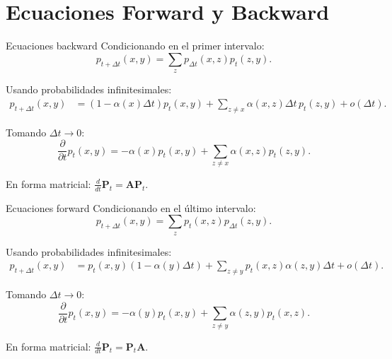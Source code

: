 \documentclass[aspectratio=169]{beamer}
\theoremstyle{plain}
\theoremstyle{definition}
\newcommand{\A}{\mathbf{A}}
\newcommand{\PP}{\mathbf{P}}
\newcommand{\1}{\mathbf{1}}
\begin{document}
\section{Ecuaciones Forward y Backward}

\begin{frame}{Ecuaciones backward}
  Condicionando en el primer intervalo:
  \[ p_{t+\Delta t}(x,y) = \sum_z p_{\Delta t}(x,z) p_t(z,y). \]
  
  Usando probabilidades infinitesimales:
  \begin{align*}
    p_{t+\Delta t}(x,y) &= (1-\alpha(x)\Delta t)p_t(x,y) + \sum_{z\neq x} \alpha(x,z)\Delta t\, p_t(z,y) + o(\Delta t).
  \end{align*}
  
  Tomando $\Delta t\to 0$:
  \[ \frac{\partial}{\partial t} p_t(x,y) = -\alpha(x)p_t(x,y) + \sum_{z\neq x} \alpha(x,z)p_t(z,y). \]
  
  En forma matricial: $\displaystyle\frac{d}{dt}\PP_t = \A\PP_t$.
\end{frame}

\begin{frame}{Ecuaciones forward}
  Condicionando en el último intervalo:
  \[ p_{t+\Delta t}(x,y) = \sum_z p_t(x,z) p_{\Delta t}(z,y). \]
  
  Usando probabilidades infinitesimales:
  \begin{align*}
    p_{t+\Delta t}(x,y) &= p_t(x,y)(1-\alpha(y)\Delta t) + \sum_{z\neq y} p_t(x,z)\alpha(z,y)\Delta t + o(\Delta t).
  \end{align*}
  
  Tomando $\Delta t\to 0$:
  \[ \frac{\partial}{\partial t} p_t(x,y) = -\alpha(y)p_t(x,y) + \sum_{z\neq y} \alpha(z,y)p_t(x,z). \]
  
  En forma matricial: $\displaystyle\frac{d}{dt}\PP_t = \PP_t\A$.
\end{frame}
\end{document}
